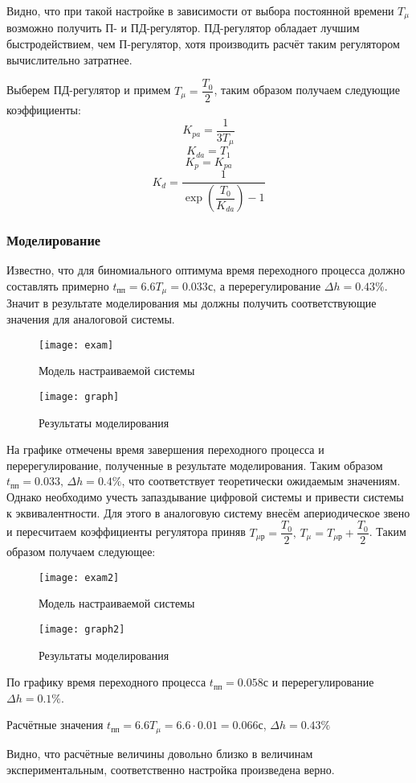             Видно, что при такой настройке в зависимости от выбора постоянной времени $ T_\mu $ возможно получить П- и ПД-регулятор. ПД-регулятор обладает лучшим быстродействием, чем П-регулятор, хотя производить расчёт таким регулятором вычислительно затратнее.
            
            Выберем ПД-регулятор и примем $ T_\mu = \dfrac{T_0}{2} $, таким образом получаем следующие коэффициенты:
            $$ K_{pa} = \dfrac{1}{3T_\mu} $$
            $$ K_{da} = T_1 $$
            $$ K_p = K_{pa} $$
            $$ K_d = \dfrac{1}{\exp\left(\dfrac{T_0}{K_{da}}\right) - 1} $$
        \subsubsection{Моделирование}
            Известно, что для биномиального оптимума время переходного процесса должно составлять примерно $ t_\text{пп} = 6.6T_\mu = 0.033 \text{с} $, а перерегулирование $ \Delta h = 0.43\% $. Значит в результате моделирования мы должны получить соответствующие значения для аналоговой системы.
            \begin{figure}[H]
                \centering\texttt{[image: exam]}
                \caption{Модель настраиваемой системы}
            \end{figure}
            \begin{figure}[H]
                \centering\texttt{[image: graph]}
                \caption{Результаты моделирования}
            \end{figure}
            На графике отмечены время завершения переходного процесса и перерегулирование, полученные в результате моделирования. Таким образом $ t_\text{пп} = 0.033,\,\Delta h = 0.4\% $, что соответствует теоретически ожидаемым значениям.
            Однако необходимо учесть запаздывание цифровой системы и привести системы к эквивалентности.
            Для этого в аналоговую систему внесём апериодическое звено и пересчитаем коэффициенты регулятора приняв $ T_{\mu \text{р}} = \dfrac{T_0}{2},\,T_\mu = T_{\mu \text{р}} + \dfrac{T_0}{2}$.
            Таким образом получаем следующее:
            \begin{figure}[H]
                \centering\texttt{[image: exam2]}
                \caption{Модель настраиваемой системы}
            \end{figure}
            \begin{figure}[H]
                \centering\texttt{[image: graph2]}
                \caption{Результаты моделирования}
            \end{figure}
            По графику время переходного процесса $ t_\text{пп} = 0.058 с$ и перерегулирование $\Delta h = 0.1\% $.
            
            Расчётные значения $ t_\text{пп} = 6.6 T_\mu = 6.6 \cdot 0.01 = 0.066 с$, $ \Delta h = 0.43\% $
            
            Видно, что расчётные величины довольно близко в величинам экспериментальным, соответственно настройка произведена верно.
